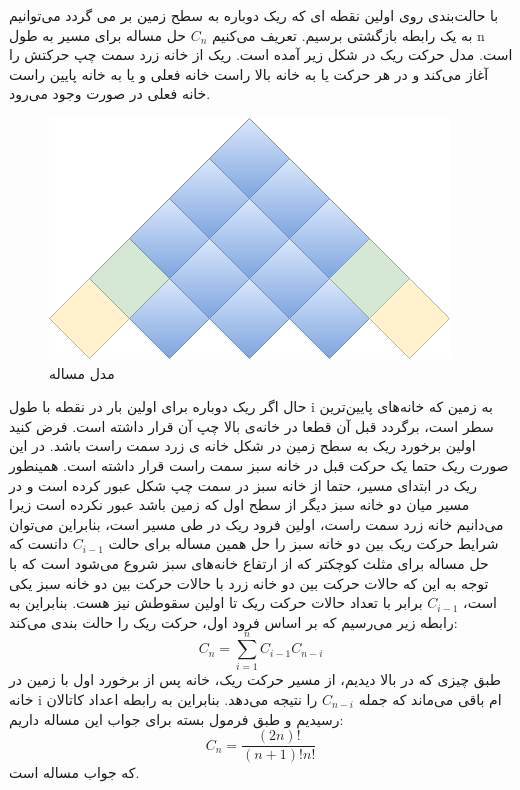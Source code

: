 \p
با حالت‌بندی روی اولین نقطه ای که ریک دوباره به سطح زمین بر می گردد می‌توانیم به یک رابطه بازگشتی برسیم. تعریف می‌کنیم \(C_n\) حل مساله برای مسیر به طول n است. مدل حرکت ریک در شکل زیر آمده است. ریک از خانه زرد سمت چپ حرکتش را آغاز می‌کند و در هر حرکت یا به خانه بالا راست خانه فعلی و یا به خانه پایین راست خانه فعلی در صورت وجود می‌رود.
\begin{figure}[h!]
    \centering
    \includegraphics[width=0.2\linewidth]{DMsoal3.png}
    		\caption{مدل مساله}
\end{figure}
حال اگر ریک دوباره برای اولین بار در نقطه با طول i به زمین که خانه‌های پایین‌ترین سطر است، برگردد قبل آن قطعا در خانه‌ی بالا چپ آن قرار داشته است. فرض کنید اولین برخورد ریک به سطح زمین در شکل خانه ی زرد سمت راست باشد. در این صورت ریک حتما یک حرکت قبل در خانه سبز سمت راست قرار داشته است. همینطور ریک در ابتدای مسیر، حتما از خانه سبز در سمت چپ شکل عبور کرده است و در مسیر میان دو خانه سبز دیگر از سطح اول که زمین باشد عبور نکرده است زیرا می‌دانیم خانه زرد سمت راست، اولین فرود ریک در طی مسیر است، بنابراین می‌توان شرایط حرکت ریک بین دو خانه سبز را حل همین مساله برای حالت \(C_{i-1}\) دانست که حل مساله برای مثلث کوچکتر که از ارتفاع خانه‌های سبز شروع می‌شود است که با توجه به این که حالات حرکت بین دو خانه زرد با حالات حرکت بین دو خانه سبز یکی است، \(C_{i-1}\) برابر با تعداد حالات حرکت ریک تا اولین سقوطش نیز هست. بنابراین به رابطه زیر می‌رسیم که بر اساس فرود اول، حرکت ریک را حالت بندی می‌کند:
\[ C_n = \sum\limits_{i=1}^{n} C_{i-1}C_{n-i} \]طبق چیزی که در بالا دیدیم، از مسیر حرکت ریک،  خانه پس از برخورد اول با زمین در خانه i ام باقی می‌ماند که جمله \(C_{n-i}\) را نتیجه می‌دهد. بنابراین به رابطه اعداد کاتالان رسیدیم و طبق فرمول بسته برای جواب این مساله داریم:
\[ C_n = \frac{(2n)!}{(n+1)!n!} \]که جواب مساله است.
  